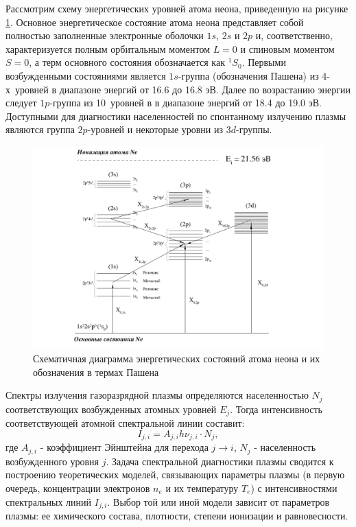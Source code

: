 Рассмотрим схему энергетических уровней атома неона, приведенную на
рисунке \ref{fig:energy_diag_NE}. Основное энергетическое состояние атома неона представляет собой
полностью заполненные электронные оболочки $1s$, $2s$ и $2p$ и, соответственно,
характеризуется полным орбитальным моментом $L = 0$ и спиновым моментом $S = 0$, а
терм основного состояния обозначается как $^1S_0$. Первыми возбужденными
состояниями является $1s$-группа (обозначения Пашена) из 4-х~уровней в диапазоне
энергий от 16.6 до 16.8 эВ.
Далее по возрастанию энергии следует $1p$-группа из 10~уровней в в диапазоне
энергий от 18.4 до 19.0 эВ. Доступными для диагностики населенностей по спонтанному
излучению плазмы являются группа $2p$-уровней и некоторые уровни из $3d$-группы.

\begin{figure}[t]
  \centering
  \includegraphics[width=16cm]{figures/energy_diag_NE}
  \caption{Схематичная диаграмма энергетических состояний атома неона и их обозначения в термах Пашена}
  \label{fig:energy_diag_NE}
\end{figure}

Спектры излучения газоразрядной плазмы определяются населенностью $N_j$ соответствующих возбужденных атомных уровней $E_j$.
Тогда интенсивность соответствующей атомной спектральной линии составит:
\begin{equation}
    I_{j,i} = A_{j,i}h\nu_{j,i}⋅N_j,
\end{equation}
где $A_{j,i}$  - коэффициент Эйнштейна для перехода $j → i$, $N_j$ - населенность возбужденного уровня $j$.
Задача спектральной диагностики плазмы сводится к построению теоретических моделей, связывающих
параметры плазмы (в первую очередь, концентрации электронов $n_e$ и их температуру $T_e$) с интенсивностями спектральных
линий $I_{j,i}$. Выбор той или иной модели зависит от параметров плазмы: ее химического состава, плотности,
степени ионизации и равновесности.


